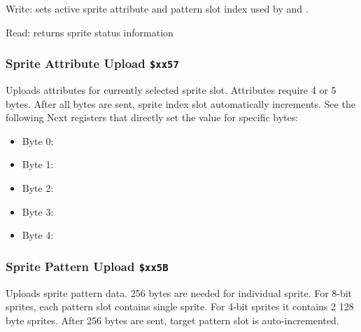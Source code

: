 \documentclass[12pt,twoside,openright,a4paper]{book}
\begin{document}
Write: sets active sprite attribute and pattern slot index used by  and .

\begin{NextPort}
\end{NextPort}

Read: returns sprite status information

\begin{NextPort}
\end{NextPort}


\subsubsection{Sprite Attribute Upload {\tt \$xx57}}

Uploads attributes for currently selected sprite slot. Attributes require 4 or 5 bytes. After all bytes are sent, sprite index slot automatically increments. See the following Next registers that directly set the value for specific bytes:

\begin{itemize}[topsep=1pt,itemsep=1pt]
	\item Byte 0: 
	\item Byte 1: 
	\item Byte 2: 
	\item Byte 3: 
	\item Byte 4: 
\end{itemize}


\subsubsection{Sprite Pattern Upload {\tt \$xx5B}}

Uploads sprite pattern data. 256 bytes are needed for individual sprite. For 8-bit sprites, each pattern slot contains single sprite. For 4-bit sprites it contains 2 128 byte sprites. After 256 bytes are sent, target pattern slot is auto-incremented.
\end{document}
